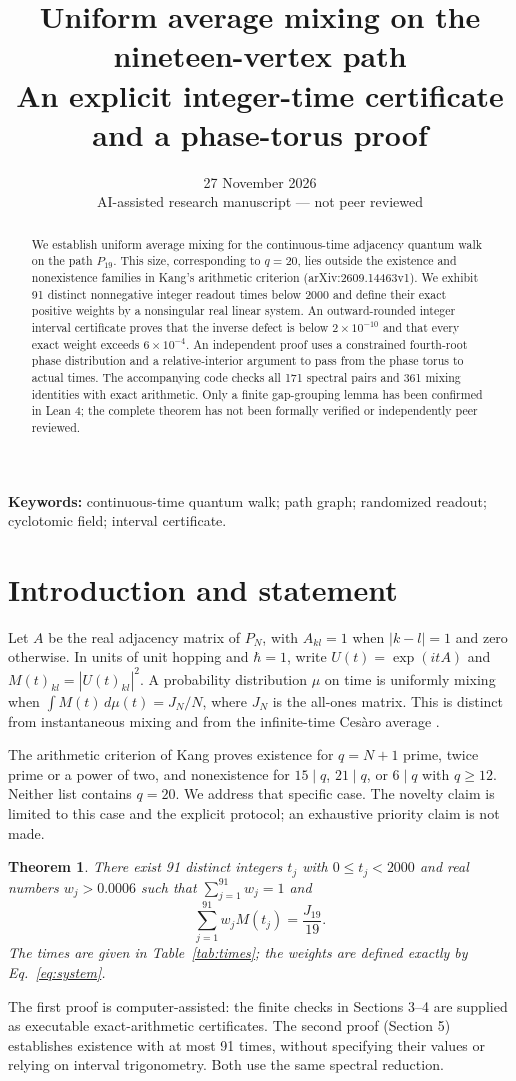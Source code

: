 \documentclass[11pt,a4paper]{article}
\title{Uniform average mixing on the nineteen-vertex path\\\large An explicit integer-time certificate and a phase-torus proof}
\author{}
\date{27 November 2026 \\ \small AI-assisted research manuscript --- not peer reviewed}
\newtheorem{theorem}{Theorem}
\begin{document}
\maketitle
\begin{abstract}
We establish uniform average mixing for the continuous-time adjacency quantum walk on the path $P_{19}$. This size, corresponding to $q=20$, lies outside the existence and nonexistence families in Kang's arithmetic criterion (arXiv:2609.14463v1). We exhibit 91 distinct nonnegative integer readout times below 2000 and define their exact positive weights by a nonsingular real linear system. An outward-rounded integer interval certificate proves that the inverse defect is below $2\times10^{-10}$ and that every exact weight exceeds $6\times10^{-4}$. An independent proof uses a constrained fourth-root phase distribution and a relative-interior argument to pass from the phase torus to actual times. The accompanying code checks all 171 spectral pairs and 361 mixing identities with exact arithmetic. Only a finite gap-grouping lemma has been confirmed in Lean 4; the complete theorem has not been formally verified or independently peer reviewed.
\end{abstract}
\noindent\textbf{Keywords:} continuous-time quantum walk; path graph; randomized readout; cyclotomic field; interval certificate.
\section{Introduction and statement}
Let $A$ be the real adjacency matrix of $P_N$, with $A_{kl}=1$ when $|k-l|=1$ and zero otherwise. In units of unit hopping and $\hbar=1$, write $U(t)=\exp(itA)$ and $M(t)_{kl}=|U(t)_{kl}|^2$. A probability distribution $\mu$ on time is uniformly mixing when $\int M(t)\,d\mu(t)=J_N/N$, where $J_N$ is the all-ones matrix. This is distinct from instantaneous mixing and from the infinite-time Cesàro average \cite{baptista,godsil}.

The arithmetic criterion of Kang \cite{kang} proves existence for $q=N+1$ prime, twice prime or a power of two, and nonexistence for $15\mid q$, $21\mid q$, or $6\mid q$ with $q\ge12$. Neither list contains $q=20$. We address that specific case. The novelty claim is limited to this case and the explicit protocol; an exhaustive priority claim is not made.
\begin{theorem}\label{thm:main}
There exist 91 distinct integers $t_j$ with $0\le t_j<2000$ and real numbers $w_j>0.0006$ such that $\sum_{j=1}^{91}w_j=1$ and
\begin{equation}\label{eq:main}
\sum_{j=1}^{91}w_j M(t_j)=\frac{J_{19}}{19}.
\end{equation}
The times are given in Table~\ref{tab:times}; the weights are defined exactly by Eq.~\eqref{eq:system}.
\end{theorem}
The first proof is computer-assisted: the finite checks in Sections 3--4 are supplied as executable exact-arithmetic certificates. The second proof (Section 5) establishes existence with at most 91 times, without specifying their values or relying on interval trigonometry. Both use the same spectral reduction.
\end{document}
